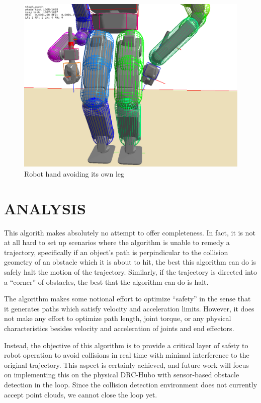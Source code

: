 \documentclass[letterpaper, 10 pt, conference]{ieeeconf}  %
\begin{document}
\begin{figure}[h]
    \includegraphics[width=\columnwidth]{pictures/thigh_punch_resolved}
    \caption{Robot hand avoiding its own leg}
    \label{fig:thigh_punch_resolved}
\end{figure}


\section{ANALYSIS}

This algorith makes absolutely no attempt to offer completeness. In fact, it is not at all hard to set up scenarios where the algorithm is unable to remedy a trajectory, specifically if an object's path is perpindicular to the collision geometry of an obstacle which it is about to hit, the best this algorithm can do is safely halt the motion of the trajectory. Similarly, if the trajectory is directed into a ``corner'' of obstacles, the best that the algorithm can do is halt.

The algorithm makes some notional effort to optimize ``safety'' in the sense that it generates paths which satisfy velocity and acceleration limits. However, it does not make any effort to optimize path length, joint torque, or any physical characteristics besides velocity and acceleration of joints and end effectors.

Instead, the objective of this algorithm is to provide a critical layer of safety to robot operation to avoid collisions in real time with minimal interference to the original trajectory. This aspect is certainly achieved, and future work will focus on implementing this on the physical DRC-Hubo with sensor-based obstacle detection in the loop. Since the collision detection environment does not currently accept point clouds, we cannot close the loop yet.
\end{document}
